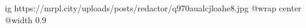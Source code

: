  
 
 
 
 

\ifcmt
  ig https://mrpl.city/uploads/posts/redactor/q970aualcjloahe8.jpg
  @wrap center
  @width 0.9
\fi

